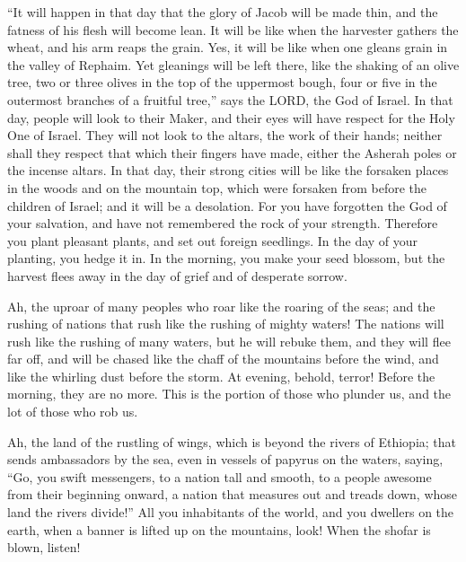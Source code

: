 \myverse{}“It will happen in that day that the glory of Jacob will be made
thin, and the fatness of his flesh will become lean.
\myverse{}It will be like when the harvester gathers the wheat, and his arm reaps the
grain. Yes, it will be like when one gleans grain in the valley of Rephaim.
\myverse{}Yet gleanings will be left there, like the shaking of an olive tree, two or
three olives in the top of the uppermost bough, four or five in the outermost branches of a fruitful tree,”
says the LORD, the God of Israel.
\myverse{}In that day, people will look to their Maker, and their eyes will have respect
for the Holy One of Israel.
\myverse{}They will not look to the altars, the work of their hands; neither shall they
respect that which their fingers have made, either the Asherah poles or the incense altars.
\myverse{}In that day, their strong cities will be like the forsaken places in the woods
and on the mountain top, which were forsaken from before the children of Israel; and it will be a desolation.
\myverse{}For you have forgotten the God of your salvation, and have not remembered
the rock of your strength. Therefore you plant pleasant plants, and set out foreign seedlings.
\myverse{}In the day of your planting, you hedge it in. In the morning, you make your
seed blossom, but the harvest flees away in the day of grief and of desperate sorrow.

\myverse{}Ah, the uproar of many peoples who roar like the roaring of
the seas; and the rushing of nations that rush like the rushing of mighty waters!
\myverse{}The nations will rush like the rushing of many waters, but he will rebuke
them, and they will flee far off, and will be chased like the chaff of the mountains before the wind,
and like the whirling dust before the storm.
\myverse{}At evening, behold, terror! Before the morning, they are no more. This is
the portion of those who plunder us, and the lot of those who rob us.


\mychapter{} \myverse*{}Ah, the land of the rustling of wings, which is beyond the rivers
of Ethiopia;
\myverse{}that sends ambassadors by the sea, even in vessels of papyrus on the waters,
saying, “Go, you swift messengers, to a nation tall and smooth, to a people awesome from their beginning
onward, a nation that measures out and treads down, whose land the rivers divide!”
\myverse{}All you inhabitants of the world, and you dwellers on the earth, when a banner
is lifted up on the mountains, look! When the shofar is blown, listen!

